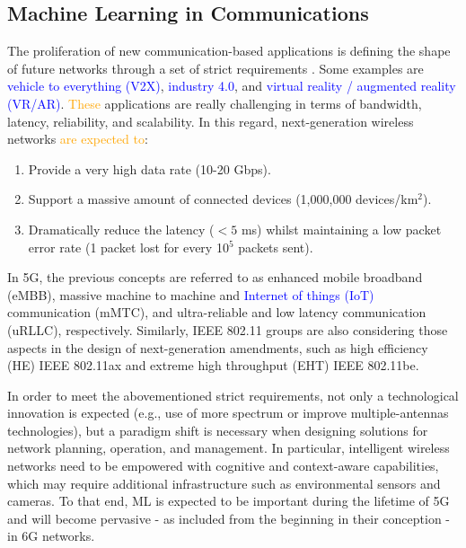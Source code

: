 \documentclass[journal]{IEEEtran}
\begin{document}
\subsection{Machine Learning in Communications}
The proliferation of new communication-based applications is defining the shape of future networks through a set of strict requirements \cite{itu2019use}. Some examples are \textcolor{blue}{vehicle to everything (V2X)}, \textcolor{blue}{industry 4.0}, and \textcolor{blue}{virtual reality / augmented reality (VR/AR)}.  \textcolor{orange}{These} applications are really challenging in terms of bandwidth, latency, reliability, and scalability. In this regard, next-generation wireless networks  \textcolor{orange}{are expected to}:
\begin{enumerate}
	\item Provide a very high data rate (10-20 Gbps).
	\item Support a massive amount of connected devices (1,000,000 devices/km$^2$).
	\item Dramatically reduce the latency ($<5$ ms) whilst maintaining a low packet error rate (1 packet lost for every 10$^5$ packets sent).
\end{enumerate}

In 5G, the previous concepts are referred to as enhanced mobile broadband (eMBB), massive machine to machine and \textcolor{blue}{Internet of things (IoT)} communication (mMTC), and ultra-reliable and low latency communication (uRLLC), respectively. Similarly, IEEE 802.11 groups are also considering those aspects in the design of next-generation amendments, such as high efficiency (HE) IEEE 802.11ax and extreme high throughput (EHT) IEEE 802.11be.

In order to meet the abovementioned strict requirements, not only a technological innovation is expected (e.g., use of more spectrum or improve multiple-antennas technologies), but a paradigm shift is necessary when designing solutions for network planning, operation, and management. In particular, intelligent wireless networks need to be empowered with cognitive and context-aware capabilities, which may require additional infrastructure such as environmental sensors and cameras. To that end, ML is expected to be important during the lifetime of 5G and will become pervasive - as included from the beginning in their conception - in 6G networks. 
\end{document}
